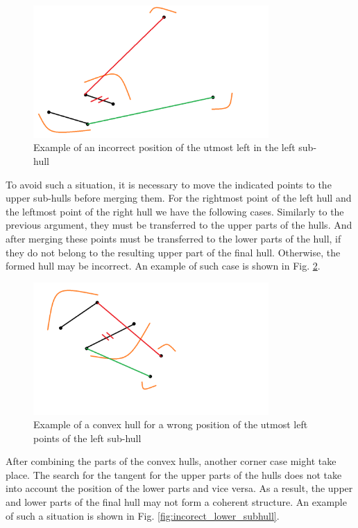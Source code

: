 \documentclass[a4paper,english,numberwithinsect,notab]{eurocg20-submission}
\begin{document}
	\begin{figure}[t]
		\centering
		\includegraphics[width=0.8\textwidth, height=0.3\textheight]{incorect_search}
		\caption{Example of an incorrect position of the utmost left in the left sub-hull}
		\label{fig:incorect_search}
	\end{figure}
	
	To avoid such a situation, it is necessary to move the indicated points to the upper sub-hulls before merging them. For the rightmost point of the left hull and the leftmost point of the right hull we have the following cases. Similarly to the previous argument, they must be transferred to the upper parts of the hulls. And after merging these points must be transferred to the lower parts of the hull, if they do not belong to the resulting upper part of the final hull. Otherwise, the formed hull may be incorrect. An example of such case is shown in Fig. \ref{fig:incorect_edge_points}.
	
	
	\begin{figure}[t]
		\centering
		\includegraphics[width=0.8\textwidth, height=0.3\textheight]{incorect_edge_points}
		\caption{Example of a convex hull for a wrong position of the utmost left points of the left sub-hull}
		\label{fig:incorect_edge_points}
	\end{figure}
	
	After combining the parts of the convex hulls, another corner case might take place. The search for the tangent for the upper parts of the hulls does not take into account the position of the lower parts and vice versa. As a result, the upper and lower parts of the final hull may not form a coherent structure. An example of such a situation is shown in Fig. \ref{fig:incorect_lower_subhull}.
	
\end{document}

